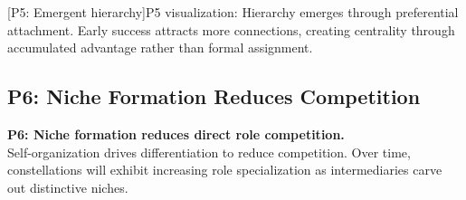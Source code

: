 \documentclass[../main.tex]{subfiles}
\begin{document}
\begin{center}
[P5: Emergent hierarchy]{P5 visualization: Hierarchy emerges through preferential attachment. Early success attracts more connections, creating centrality through accumulated advantage rather than formal assignment.}
\end{center}

\vspace{0.5cm}
\subsection{P6: Niche Formation Reduces Competition}

\begin{propositionbox}
\textbf{P6: Niche formation reduces direct role competition.}\\[3pt]
Self-organization drives differentiation to reduce competition. Over time, constellations will exhibit increasing role specialization as intermediaries carve out distinctive niches.
\end{propositionbox}
\end{document}
